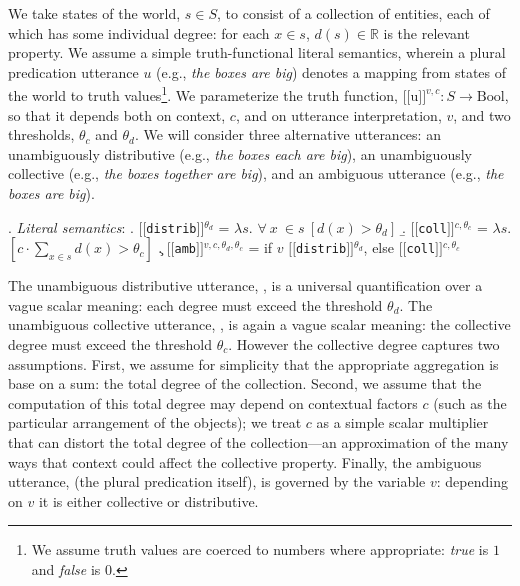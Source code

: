 \documentclass[linguex]{sp}
\newcommand{\sem}[1]{\mbox{$[\![$#1$]\!]$}}
\newcommand{\lam}{$\lambda$}
\begin{document}
We take states of the world, $s\in S$, to consist of a collection of entities, each of which has some individual degree: for each $x\in s$, $d(s)\in \mathbb R$ is the relevant property.
We assume a simple truth-functional literal semantics, wherein a plural predication utterance $u$ (e.g., \emph{the boxes are big})  denotes a mapping from states of the world to truth values\footnote{We assume truth values are coerced to numbers where appropriate: \emph{true} is $1$ and \emph{false} is $0$.}. We parameterize the truth function, $\sem{u}^{v,c}: S \rightarrow \text{Bool}$, so that it depends both on context, $c$, and on utterance interpretation, $v$, and two thresholds, $\theta_c$ and $\theta_d$. 
We will consider three alternative utterances: 
an {unambiguously distributive} (e.g., \emph{the boxes each are big}), an {unambiguously collective} (e.g., \emph{the boxes together are big}), and an {ambiguous} utterance (e.g., \emph{the boxes are big}).

 \ex. \emph{Literal semantics}:
 \a. \label{dist}\sem{\texttt{distrib}}$^{\theta_d}$ = 
   \lam $s$. $\forall \ x\ \in s\ [d(x) > \theta_d]$
\b. \label{coll}\sem{\texttt{coll}}$^{c,\theta_c}$ = 
   \lam $s$. $[c \cdot \sum_{x\in s} d(x) > \theta_c]$
\c.  \label{amb}\sem{\texttt{amb}}$^{v, c, \theta_d, \theta_c}$ = 
   if $v$ \sem{\texttt{distrib}}$^{\theta_d}$, else \sem{\texttt{coll}}$^{c,\theta_c}$

The unambiguous distributive utterance, \Last[a], is a universal quantification over a vague scalar meaning: each degree must exceed the threshold $\theta_d$. 
The unambiguous collective utterance, \Last[b], is again a vague scalar meaning: the collective degree must exceed the threshold $\theta_c$. 
However the collective degree captures two assumptions. First, we assume for simplicity that the appropriate aggregation is base on a sum: the total degree of the collection.
Second, we assume that the computation of this total degree may depend on contextual factors $c$ (such as the particular arrangement of the objects); we treat $c$ as a simple scalar multiplier that can distort the total degree of the collection---an approximation of the many ways that context could affect the collective property. 
Finally, the ambiguous utterance, \Last[c] (the plural predication itself), is governed by the variable $v$: depending on $v$ it is either collective or distributive.
\end{document}
